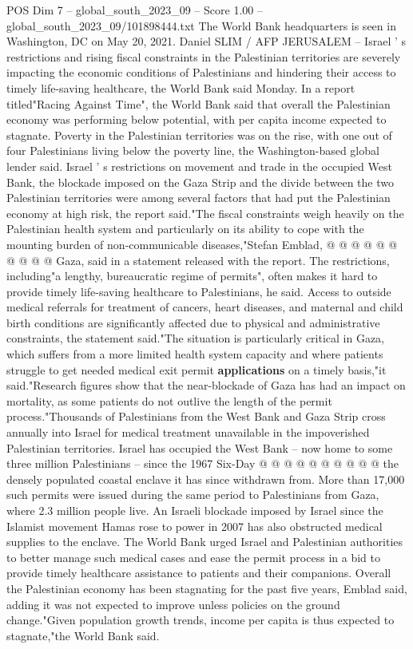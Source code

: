 \begin{textsample}{POS Dim 7 – global\_south\_2023\_09 – Score 1.00 – global\_south\_2023\_09/101898444.txt}  \label{ex:f7_pos_007}
The World Bank headquarters is seen in Washington, DC on May 20, 2021.
Daniel SLIM / AFP JERUSALEM -- Israel ' s restrictions and rising fiscal constraints in the Palestinian territories are severely impacting the economic conditions of Palestinians and hindering their access to timely life-saving healthcare, the World Bank said Monday.
In a report titled"Racing Against Time", the World Bank said that overall the Palestinian economy was performing below potential, with per capita income expected to stagnate.
Poverty in the Palestinian territories was on the rise, with one out of four Palestinians living below the poverty line, the Washington-based global lender said.
Israel ' s restrictions on movement and trade in the occupied West Bank, the blockade imposed on the Gaza Strip and the divide between the two Palestinian territories were among several factors that had put the Palestinian economy at high risk, the report said."The fiscal constraints weigh heavily on the Palestinian health system and particularly on its ability to cope with the mounting burden of non-communicable diseases,"Stefan Emblad, @ @ @ @ @ @ @ @ @ @ Gaza, said in a statement released with the report.
The restrictions, including"a lengthy, bureaucratic regime of permits", often makes it hard to provide timely life-saving healthcare to Palestinians, he said.
Access to outside medical referrals for treatment of cancers, heart diseases, and maternal and child birth conditions are significantly affected due to physical and administrative constraints, the statement said."The situation is particularly critical in Gaza, which suffers from a more limited health system capacity and where patients struggle to get needed medical exit permit \textbf{applications} on a timely basis,"it said."Research figures show that the near-blockade of Gaza has had an impact on mortality, as some patients do not outlive the length of the permit process."Thousands of Palestinians from the West Bank and Gaza Strip cross annually into Israel for medical treatment unavailable in the impoverished Palestinian territories.
Israel has occupied the West Bank -- now home to some three million Palestinians -- since the 1967 Six-Day @ @ @ @ @ @ @ @ @ @ the densely populated coastal enclave it has since withdrawn from.
More than 17,000 such permits were issued during the same period to Palestinians from Gaza, where 2.3 million people live.
An Israeli blockade imposed by Israel since the Islamist movement Hamas rose to power in 2007 has also obstructed medical supplies to the enclave.
The World Bank urged Israel and Palestinian authorities to better manage such medical cases and ease the permit process in a bid to provide timely healthcare assistance to patients and their companions.
Overall the Palestinian economy has been stagnating for the past five years, Emblad said, adding it was not expected to improve unless policies on the ground change."Given population growth trends, income per capita is thus expected to stagnate,"the World Bank said.

\end{textsample}
